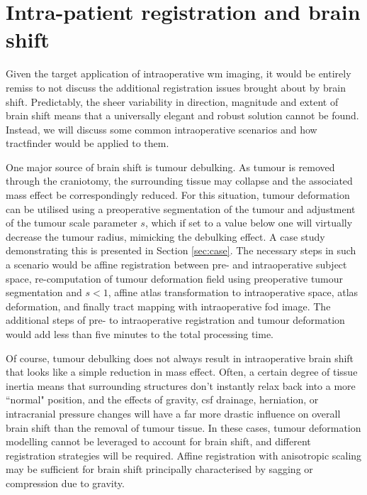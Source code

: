 \section{Intra-patient registration and brain shift}

Given the target application of intraoperative \gls{wm} imaging, it would be entirely remiss to not discuss the additional registration issues brought about by brain shift.
Predictably, the sheer variability in direction, magnitude and extent of brain shift means that a universally elegant and robust solution cannot be found.
Instead, we will discuss some common intraoperative scenarios and how tractfinder would be applied to them.

One major source of brain shift is tumour debulking.
As tumour is removed through the craniotomy, the surrounding tissue may collapse and the associated mass effect be correspondingly reduced.
For this situation, tumour deformation can be utilised using a preoperative segmentation of the tumour and adjustment of the tumour scale parameter $s$, which if set to a value below one will virtually decrease the tumour radius, mimicking the debulking effect.
A case study demonstrating this is presented in Section \ref{sec:case}.
The necessary steps in such a scenario would be affine registration between pre- and intraoperative subject space, re-computation of tumour deformation field using preoperative tumour segmentation and $s<1$, affine atlas transformation to intraoperative space, atlas deformation, and finally tract mapping with intraoperative \gls{fod} image.
The additional steps of pre- to intraoperative registration and tumour deformation would add less than five minutes to the total processing time.

Of course, tumour debulking does not always result in intraoperative brain shift that looks like a simple reduction in mass effect.
Often, a certain degree of tissue inertia means that surrounding structures don't instantly relax back into a more ``normal" position, and the effects of gravity, \gls{csf} drainage, herniation, or intracranial pressure changes will have a far more drastic influence on overall brain shift than the removal of tumour tissue.
In these cases, tumour deformation modelling cannot be leveraged to account for brain shift, and different registration strategies will be required.
Affine registration with anisotropic scaling may be sufficient for brain shift principally characterised by sagging or compression due to gravity.

